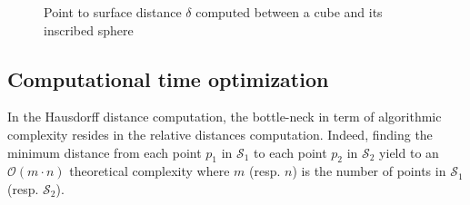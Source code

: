 \documentclass{InsightArticle}
\begin{document}
\begin{figure}
\centering
{}
\hspace{0.1 \textwidth}
\caption{Point to surface distance $\delta$ computed between a cube and its inscribed sphere}
\label{Fig:sphere-cube}
\end{figure}
%
\subsection{Computational time optimization}
%
In the Hausdorff distance computation, the bottle-neck in term of algorithmic complexity resides in the relative distances computation. Indeed, finding the minimum distance from each point $p_1$ in $\mathcal{S}_1$ to each point $p_2$ in $\mathcal{S}_2$ yield to an $\mathcal{O}(m\cdot n)$ theoretical complexity where $m$ (resp. $n$) is the number of points in $\mathcal{S}_1$ (resp. $\mathcal{S}_2$).
\end{document}
